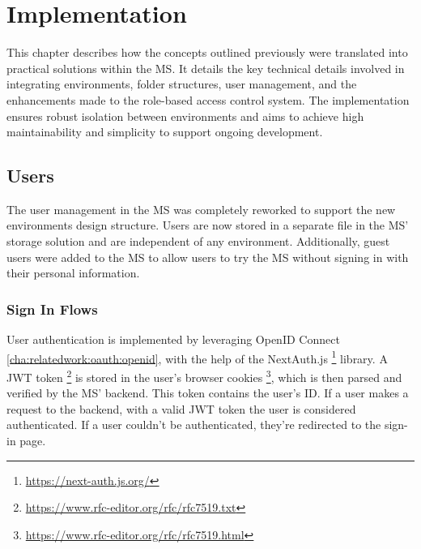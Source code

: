 \chapter{Implementation}
\label{cha:implementation}

This chapter describes how the concepts outlined previously were translated into practical solutions within the MS.
It details the key technical details involved in integrating environments,
folder structures,
user management,
and the enhancements made to the role-based access control system.
The implementation ensures robust isolation between environments and 
aims to achieve high maintainability and simplicity to support ongoing development.


\section{Users}

The user management in the MS was completely reworked to support the new 
environments design structure.
Users are now stored in a separate file in the MS' storage solution and are independent of
any environment.
Additionally, guest users were added to the MS to allow users to try the MS without
signing in with their personal information.

%

\subsection{Sign In Flows}

User authentication is implemented by leveraging OpenID Connect \ref{cha:relatedwork:oauth:openid},
with the help of the NextAuth.js \footnote{\url{https://next-auth.js.org/}} library.
A JWT token \footnote{\url{https://www.rfc-editor.org/rfc/rfc7519.txt}}
is stored in the user's browser cookies \footnote{\url{https://www.rfc-editor.org/rfc/rfc7519.html}},
which is then parsed and verified by the MS' backend.
This token contains the user's ID.
If a user makes a request to the backend,
with a valid JWT token the user is considered authenticated.
If a user couldn't be authenticated, they're redirected to the sign-in page.

